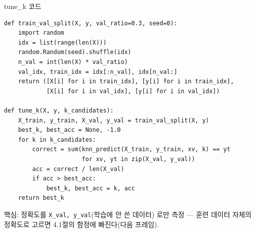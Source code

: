 \documentclass[aspectratio=169,11pt]{beamer}
\begin{document}

\begin{frame}[fragile]{tune\_k 코드}
\begin{lstlisting}
def train_val_split(X, y, val_ratio=0.3, seed=0):
    import random
    idx = list(range(len(X)))
    random.Random(seed).shuffle(idx)
    n_val = int(len(X) * val_ratio)
    val_idx, train_idx = idx[:n_val], idx[n_val:]
    return ([X[i] for i in train_idx], [y[i] for i in train_idx],
            [X[i] for i in val_idx], [y[i] for i in val_idx])

def tune_k(X, y, k_candidates):
    X_train, y_train, X_val, y_val = train_val_split(X, y)
    best_k, best_acc = None, -1.0
    for k in k_candidates:
        correct = sum(knn_predict(X_train, y_train, xv, k) == yt
                      for xv, yt in zip(X_val, y_val))
        acc = correct / len(X_val)
        if acc > best_acc:
            best_k, best_acc = k, acc
    return best_k
\end{lstlisting}
  핵심: 정확도를 \texttt{X\_val, y\_val}(학습에 안 쓴 데이터)
  로만 측정 --- 훈련 데이터 자체의 정확도로 고르면 4.1절의
  함정에 빠진다(다음 프레임).
\end{frame}
\end{document}
